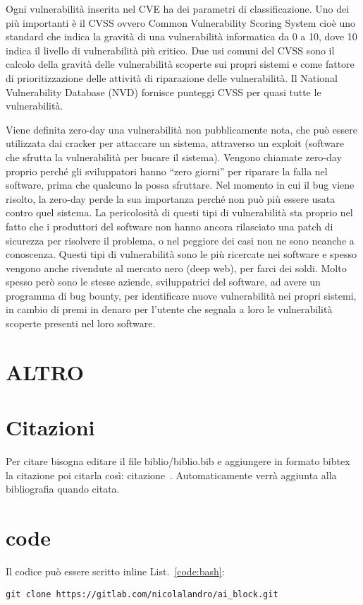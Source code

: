 Ogni vulnerabilità inserita nel CVE ha dei parametri di classificazione. 
Uno dei più importanti è il CVSS ovvero Common Vulnerability Scoring System 
cioè uno standard che indica la gravità di una vulnerabilità informatica 
da 0 a 10, dove 10 indica il livello di vulnerabilità più critico. 
Due usi comuni del CVSS sono il calcolo della gravità delle vulnerabilità 
scoperte sui propri sistemi e come fattore di prioritizzazione delle 
attività di riparazione delle vulnerabilità. Il National Vulnerability 
Database (NVD) fornisce punteggi CVSS per quasi tutte le vulnerabilità.

Viene definita zero-day una vulnerabilità non pubblicamente nota, che può 
essere utilizzata dai cracker per attaccare un sistema, attraverso un 
exploit (software che sfrutta la vulnerabilità per bucare il sistema). 
Vengono chiamate zero-day proprio perché gli sviluppatori hanno “zero giorni” 
per riparare la falla nel software, prima che qualcuno la possa sfruttare.
Nel momento in cui il bug viene risolto, la zero-day perde la sua importanza
perché non può più essere usata contro quel sistema.
La pericolosità di questi tipi di vulnerabilità sta proprio nel fatto che i 
produttori del software non hanno ancora rilasciato una patch di sicurezza 
per risolvere il problema, o nel peggiore dei casi non ne sono 
neanche a conoscenza. 
Questi tipi di vulnerabilità sono le più ricercate nei software e spesso 
vengono anche rivendute al mercato nero (deep web), per farci dei soldi.
Molto spesso però sono le stesse aziende, sviluppatrici del software, ad avere 
un programma di bug bounty, per identificare nuove vulnerabilità nei propri
sistemi, in cambio di premi in denaro per l’utente che segnala a loro
le vulnerabilità scoperte presenti nel loro software.



\section{ALTRO}
\section{Citazioni}
Per citare bisogna editare il file biblio/biblio.bib e aggiungere in formato bibtex la citazione poi citarla così: citazione~\cite{STORY}. 
Automaticamente verrà aggiunta alla bibliografia quando citata.

\section{code}

Il codice può essere scritto inline List.~\ref{code:bash}:
\begin{lstlisting}[language=DebianBash, style=basic, label=code:bash, caption=sample bash]
git clone https://gitlab.com/nicolalandro/ai_block.git
\end{lstlisting}

